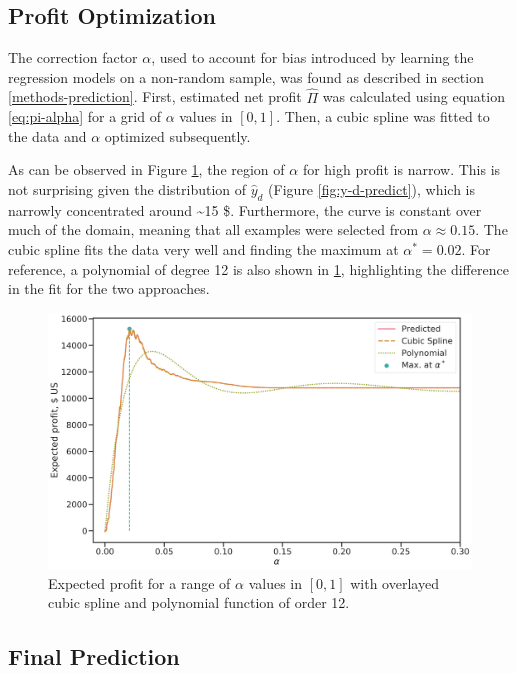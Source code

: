 \documentclass[
  11pt,
  a4paper,
  DIV=12,captions=tableheading,oneside,titlepage]{scrbook}
\begin{document}
\hypertarget{profit-optimization}{%
\subsection{Profit Optimization}\label{profit-optimization}}

The correction factor \(\alpha\), used to account for bias introduced by learning the regression models on a non-random sample, was found as described in section \ref{methods-prediction}. First, estimated net profit \(\hat{\Pi}\) was calculated using equation \eqref{eq:pi-alpha} for a grid of \(\alpha\) values in \([0,1]\). Then, a cubic spline was fitted to the data and \(\alpha\) optimized subsequently.

As can be observed in Figure \ref{fig:alpha-grid}, the region of \(\alpha\) for high profit is narrow. This is not surprising given the distribution of \(\hat{y}_d\) (Figure \ref{fig:y-d-predict}), which is narrowly concentrated around \textasciitilde{}15 \$. Furthermore, the curve is constant over much of the domain, meaning that all examples were selected from \(\alpha \approx 0.15\). The cubic spline fits the data very well and finding the maximum at \(\alpha^*=0.02\). For reference, a polynomial of degree 12 is also shown in \ref{fig:alpha-grid}, highlighting the difference in the fit for the two approaches.



\begin{figure}

{\centering \includegraphics[width=0.7\linewidth]{figures/predictions/comparison-alpha-profit-models} 

}

\caption{Expected profit for a range of \(\alpha\) values in \([0,1]\) with overlayed cubic spline and polynomial function of order 12.}\label{fig:alpha-grid}
\end{figure}

\hypertarget{final-prediction}{%
\subsection{Final Prediction}\label{final-prediction}}
\end{document}

